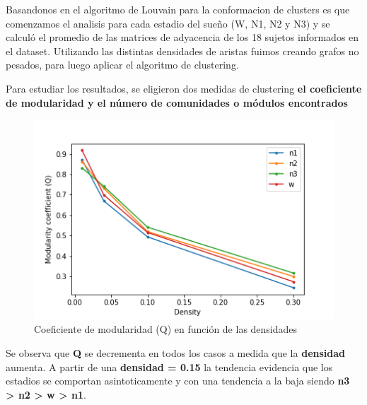 


Basandonos en el algoritmo de Louvain para la conformacion de clusters es que comenzamos el analisis para cada estadio del sueño (W, N1, N2 y N3) y se calculó el promedio de las matrices de adyacencia de los 18 sujetos informados en el dataset.
Utilizando las distintas densidades de aristas fuimos creando grafos no pesados, para luego aplicar el algoritmo de clustering.

Para estudiar los resultados, se eligieron dos medidas de clustering \textbf{el coeficiente de modularidad y el número
de comunidades o módulos encontrados}


\begin{figure}[H]
    \centering
    \includegraphics[width=\textwidth]{img/2_mod_coeff.png}
    \caption{Coeficiente de modularidad (Q) en función de las densidades}
    \label{fig:2_mod_coeff}
\end{figure}

Se observa que \textbf{Q} se decrementa en todos los casos a medida que la \textbf{densidad} aumenta. A partir de una \textbf{densidad = 0.15} la tendencia evidencia que los estadios se comportan asintoticamente y con una tendencia a la baja siendo \textbf{n3 > n2 > w > n1}.


